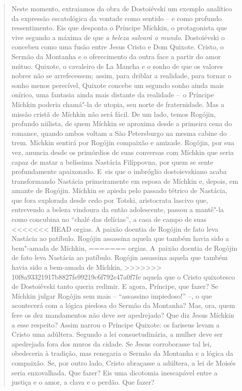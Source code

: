 {\begin{quote}
Neste momento, extraiamos da obra de Dostoiévski um exemplo analítico da
expressão escatológica da vontade como sentido -- e como profundo
ressentimento. Eis que desponta o Príncipe Míchkin, o protagonista que
vive segundo a máxima de que \emph{a beleza salvará o mundo}.
Dostoiévski o concebeu como uma fusão entre Jesus Cristo e Dom Quixote.
Cristo, o Sermão da Montanha e o oferecimento da outra face a partir do
amor mútuo. Quixote, o cavaleiro de La Mancha e o sonho de que os
valores nobres não se arrefecessem; assim, para driblar a realidade,
para tornar o sonho menos perecível, Quixote concebe um segundo sonho
ainda mais onírico, uma fantasia ainda mais distante da realidade --~o
Príncipe Míchkin poderia chamá"-la de utopia, seu norte de fraternidade.
Mas a missão cristã de Míchkin não será fácil. De um lado, temos
Rogójin, profundo niilista, de quem Míchkin se aproxima desde a primeira
cena do romance, quando ambos voltam a São Petersburgo na mesma cabine
do trem. Míchkin sentirá por Rogójin compaixão e amizade. Rogójin, por
sua vez, anuncia desde os primórdios de suas conversas com Míchkin que
seria capaz de matar a belíssima Nastácia Filíppovna, por quem se sente
profundamente apaixonado. E~eis que o imbróglio dostoievskiano acaba
transformando Nastácia primeiramente em esposa de Míchkin e, depois, em
amante de Rogójin. Míchkin se apieda pelo passado tétrico de Nastácia,
que fora explorada desde cedo por Totski, aristocrata lascivo que,
entrevendo a beleza vindoura da então adolescente, passou a mantê"-la
como concubina no ``chalé das delícias'', a casa de campo de suas
<<<<<<< HEAD
orgias. A paixão doentia de Rogójin de fato leva Nastácia ao patíbulo.
Rogójin assassina aquela que também havia sido a bem"-amada de Míchkin,
=======
orgias. A~paixão doentia de Rogójin de fato leva Nastácia ao patíbulo.
Rogójin assassina aquela que também havia sido a bem-amada de Míchkin,
>>>>>>> 10f8a93321917b8827fe99219c6f792e47a0f7fe
aquela que o Cristo quixotesco de Dostoiévski tanto queria redimir. E
agora, Príncipe, que fazer? Se Míchkin julgar Rogójin sem mais --
``assassino impiedoso!'' --, o que acontecerá com a lógica piedosa do
Sermão da Montanha? Mas, ora, quem fere os dez mandamentos não deve ser
apedrejado? Que diz Jesus Míchkin a esse respeito? Assim narrou o
Príncipe Quixote: os fariseus levam a Cristo uma adúltera. Segundo a lei
consuetudinária, a mulher deve ser apedrejada fora dos muros da cidade.
Se Jesus corroborasse tal lei, obedeceria à tradição, mas renegaria o
Sermão da Montanha e a lógica da compaixão. Se, por outro lado, Cristo
abraçasse a adúltera, a lei de Moisés seria enxovalhada. Que fazer? Eis
uma dicotomia inescapável entre a justiça e o amor, a clava e o perdão.
Que fazer?


\end{quote}}
